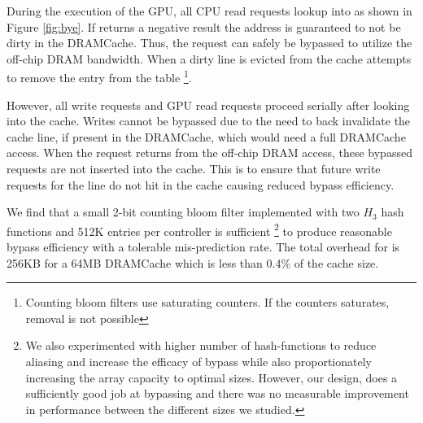 During the execution of the GPU, all CPU read requests lookup into \bypassname as shown in Figure \ref{fig:bye}. If \bypassname returns a  negative result the address is guaranteed to not be dirty in the DRAMCache. Thus, the request can safely be bypassed to utilize the off-chip DRAM bandwidth. 
When a dirty line is evicted from the cache \bypassname attempts to remove the entry from the table \footnote{Counting bloom filters use saturating counters. If the counters saturates, removal is not possible}.
\par However, all write requests and GPU read requests proceed serially after looking into the cache. Writes cannot be bypassed due to the need to back invalidate the cache line, if present in the DRAMCache, which would need a full DRAMCache access.
When the request returns from the off-chip DRAM access, these bypassed requests are not inserted into the cache. This is to ensure that future write requests for the line do not hit in the cache causing reduced bypass efficiency.
\par We find that a small 2-bit counting bloom filter implemented with two $H_3$ hash functions \cite{h3} and 512K entries per controller is sufficient 
\footnote{We also experimented with higher number of hash-functions to reduce aliasing and increase the efficacy of bypass while also proportionately increasing the array capacity to optimal sizes. However, our \bypassname design, does a sufficiently good job at bypassing and there was no measurable improvement in performance between the different sizes we studied.}
to produce reasonable bypass efficiency with a tolerable mis-prediction rate. The total overhead for \bypassname is 256KB for a 64MB DRAMCache which is less than 0.4\% of the cache size.


